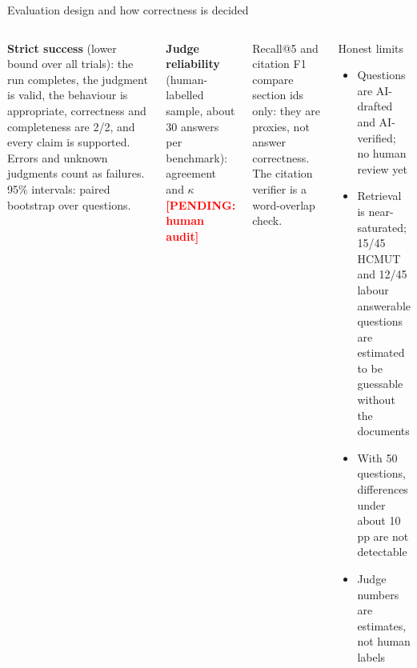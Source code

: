 \documentclass[aspectratio=1610,11pt]{beamer}
\newcommand{\pend}[1]{\textcolor{red}{\textbf{[PENDING: #1]}}}
\newcommand{\pp}{\,pp\xspace}
\begin{document}
\begin{frame}{Evaluation design and how correctness is decided}
  \centering
  \vspace{5pt}

  \begin{columns}[T]
    \footnotesize
    \textbf{Strict success} (lower bound over all trials): the run completes, the judgment is valid, the behaviour is appropriate, correctness and completeness are 2/2, and every claim is supported. Errors and unknown judgments count as failures. 95\% intervals: paired bootstrap over questions.
    \vspace{4pt}

    \textbf{Judge reliability} (human-labelled sample, about 30 answers per benchmark): agreement and $\kappa$ \pend{human audit}
    \vspace{4pt}

    Recall@5 and citation F1 compare section ids only: they are proxies, not answer correctness. The citation verifier is a word-overlap check.

    \begin{alertblock}{Honest limits}
      \footnotesize
      \begin{itemize}
        \item Questions are AI-drafted and AI-verified; no human review yet
        \item Retrieval is near-saturated; 15/45 HCMUT and 12/45 labour answerable questions are estimated to be guessable without the documents
        \item With 50 questions, differences under about 10\pp are not detectable
        \item Judge numbers are estimates, not human labels
      \end{itemize}
    \end{alertblock}
  \end{columns}
\end{frame}
\end{document}
